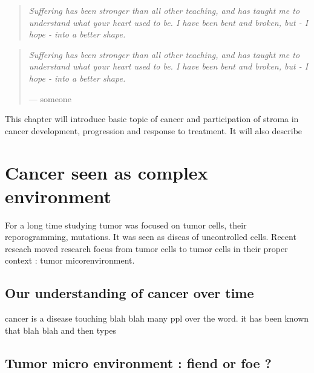 \documentclass[12pt,]{book}
\theoremstyle{definition}
\theoremstyle{definition}
\theoremstyle{definition}
\theoremstyle{remark}
\begin{document}
\setcounter{page}{11}\vspace*{\fill}

\begin{quote}
 \emph{Suffering has been stronger than all other teaching, and has taught me to understand what your heart used to be. I have been bent and broken, but - I hope - into a better shape.}
 \end{quote}

\vspace*{\fill}

\begin{quote}
\emph{Suffering has been stronger than all other teaching, and has
taught me to understand what your heart used to be. I have been bent and
broken, but - I hope - into a better shape.}

--- someone
\end{quote}

This chapter will introduce basic topic of cancer and participation of
stroma in cancer development, progression and response to treatment. It
will also describe

\hypertarget{cancer-seen-as-complex-environment}{%
\section{Cancer seen as complex
environment}\label{cancer-seen-as-complex-environment}}

For a long time studying tumor was focused on tumor cells, their
reporogramming, mutations. It was seen as diseas of uncontrolled cells.
Recent reseach moved research focus from tumor cells to tumor cells in
their proper context : tumor micorenvironment.

\hypertarget{our-understanding-of-cancer-over-time}{%
\subsection{Our understanding of cancer over
time}\label{our-understanding-of-cancer-over-time}}

cancer is a disease touching blah blah many ppl over the word. it has
been known that blah blah and then types

\hypertarget{tumor-micro-environment-fiend-or-foe}{%
\subsection{Tumor micro environment : fiend or foe
?}\label{tumor-micro-environment-fiend-or-foe}}
\end{document}
